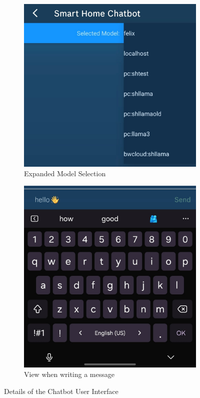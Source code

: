 \begin{figure}[b]
    \centering
      \begin{subfigure}[t]{.48\textwidth}
        \vspace*{0pt}
        \includegraphics[width=\textwidth]{graphics/model-select.jpg}
        \caption{Expanded Model Selection}
        \label{fig:model-select}
      \end{subfigure} \hfill
      \begin{subfigure}[t]{.43\textwidth}
        \vspace*{0pt}
        \includegraphics[width=\textwidth]{graphics/keyboard.jpg}
        \caption{View when writing a message}
        \label{fig:keyboard}
        \end{subfigure}
      \caption{Details of the Chatbot User Interface}
      \label{fig:ui-details}
\end{figure}

